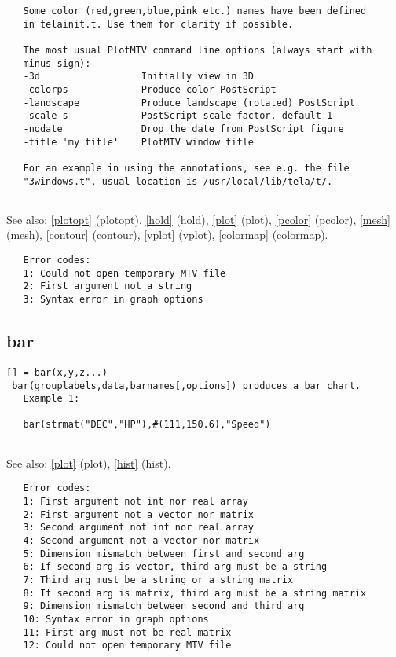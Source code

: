 \documentclass[a4paper]{article}
\begin{document}
\begin{tscreen}
\begin{verbatim}
   Some color (red,green,blue,pink etc.) names have been defined
   in telainit.t. Use them for clarity if possible.
   
   The most usual PlotMTV command line options (always start with
   minus sign):
   -3d                  Initially view in 3D
   -colorps             Produce color PostScript
   -landscape           Produce landscape (rotated) PostScript
   -scale s             PostScript scale factor, default 1
   -nodate              Drop the date from PostScript figure
   -title 'my title'    PlotMTV window title
   
   For an example in using the annotations, see e.g. the file
   "3windows.t", usual location is /usr/local/lib/tela/t/.
   
\end{verbatim}

See also: \ref{plotopt} {(plotopt)}, \ref{hold} {(hold)}, \ref{plot} {(plot)}, \ref{pcolor} {(pcolor)}, \ref{mesh} {(mesh)}, \ref{contour} {(contour)}, \ref{vplot} {(vplot)}, \ref{colormap} {(colormap)}.
\begin{verbatim}
   Error codes:
   1: Could not open temporary MTV file
   2: First argument not a string
   3: Syntax error in graph options 
\end{verbatim}
\end{tscreen}



\subsection{bar\label{bar}}

\begin{tscreen}
\begin{verbatim}
[] = bar(x,y,z...)
 bar(grouplabels,data,barnames[,options]) produces a bar chart.
   Example 1:
   
   bar(strmat("DEC","HP"),#(111,150.6),"Speed")
   
\end{verbatim}

See also: \ref{plot} {(plot)}, \ref{hist} {(hist)}.
\begin{verbatim}
   Error codes:
   1: First argument not int nor real array
   2: First argument not a vector nor matrix
   3: Second argument not int nor real array
   4: Second argument not a vector nor matrix
   5: Dimension mismatch between first and second arg
   6: If second arg is vector, third arg must be a string
   7: Third arg must be a string or a string matrix
   8: If second arg is matrix, third arg must be a string matrix
   9: Dimension mismatch between second and third arg
   10: Syntax error in graph options
   11: First arg must not be real matrix
   12: Could not open temporary MTV file
   
\end{verbatim}
\end{tscreen}
\end{document}
